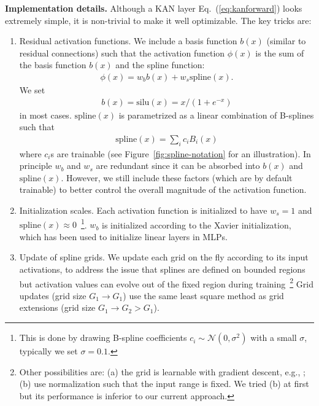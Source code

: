 \documentclass[12pt]{caltech_thesis}
\numberwithin{equation}{section}
\begin{document}
\textbf{Implementation details.}
Although a KAN layer Eq.~(\ref{eq:kanforward}) looks extremely simple, it is non-trivial to make it well optimizable. The key tricks are: %
\begin{enumerate}[(1)]
    \item  Residual activation functions. We include a basis function $b(x)$ (similar to residual connections) such that the activation function $\phi(x)$ is the sum of the basis function $b(x)$ and the spline function:
    \begin{align}\label{KAN-activation-function}
        \phi(x)=w_{b} b(x)+w_{s}{\text{spline}}(x).
    \end{align}
    We set
    \begin{align}
        b(x)={\text{silu}}(x)=x/(1+e^{-x})
    \end{align}
    in most cases. ${\text{spline}}(x)$ is parametrized as a linear combination of B-splines such that
    \begin{align}
        {\text{spline}}(x) = \sum_i c_iB_i(x)
    \end{align}
    where $c_i$s are trainable (see Figure~\ref{fig:spline-notation} for an illustration). In principle $w_b$ and $w_s$ are redundant since it can be absorbed into $b(x)$ and ${\text{spline}}(x)$. However, we still include these factors (which are by default trainable) to better control the overall magnitude of the activation function.
    \item Initialization scales. Each activation function is initialized to have $w_s=1$ and $\text{spline}(x)\approx 0$~\footnote{This is done by drawing B-spline coefficients $c_i\sim\mathcal{N}(0,\sigma^2)$ with a small $\sigma$, typically we set $\sigma=0.1$.}. $w_b$ is initialized according to the Xavier initialization, which has been used to initialize linear layers in MLPs.
    \item Update of spline grids. We update each grid on the fly according to its input activations, to address the issue that splines are defined on bounded regions but activation values can evolve out of the fixed region during training~\footnote{Other possibilities are: (a) the grid is learnable with gradient descent, e.g., \cite{xu2015nonlinear}; (b) use normalization such that the input range is fixed. We tried (b) at first but its performance is inferior to our current approach.} Grid updates (grid size $G_1\to G_1$) use the same least square method as grid extensions (grid size $G_1\to G_2>G_1$). 
\end{enumerate}
\end{document}

